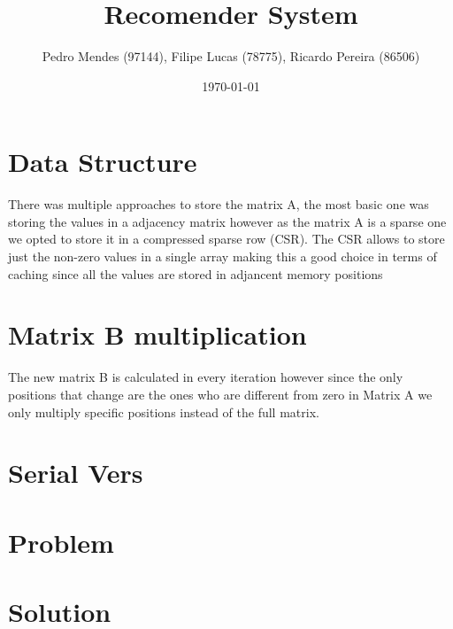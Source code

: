 \documentclass[a4paper]{article}
\begin{document}
\title{Recomender System}
\author{Pedro Mendes (97144), Filipe Lucas (78775), Ricardo Pereira (86506)}
\date{\today}
\maketitle

\section{Data Structure}
There was multiple approaches to store the matrix A, the most basic one was
storing the values in a adjacency matrix however as the matrix A is a sparse one
we opted to store it in a compressed sparse row (CSR). The CSR allows to store
just the non-zero values in a single array making this a good choice in terms of
caching since all the values are stored in adjancent memory positions

\section{Matrix B multiplication}
The new matrix B is calculated in every iteration however since the only
positions that change are the ones who are different from zero in Matrix A we
only multiply specific positions instead of the full matrix.
\section{Serial Vers}

\section{Problem}

\section{Solution}



\end{document}
